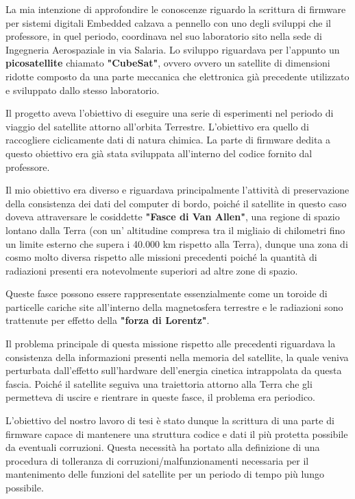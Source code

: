 \documentclass[LaM,binding=0.6cm]{../sapthesis}
\begin{document}
La mia intenzione di approfondire le conoscenze riguardo la scrittura di firmware per sistemi digitali Embedded calzava a pennello con uno degli sviluppi che il professore, in quel periodo, coordinava nel suo laboratorio sito nella sede di Ingegneria Aerospaziale in via Salaria. Lo sviluppo riguardava per l'appunto un \textbf{picosatellite} chiamato  \textbf{"CubeSat"}, ovvero ovvero un satellite di dimensioni ridotte composto da una parte meccanica che elettronica già precedente utilizzato e sviluppato dallo stesso laboratorio. 

Il progetto aveva l'obiettivo di eseguire una serie di esperimenti nel periodo di viaggio del satellite attorno all'orbita Terrestre. L'obiettivo era quello di raccogliere ciclicamente dati di natura chimica. La parte di firmware dedita a questo obiettivo era già stata sviluppata all'interno del codice fornito dal professore. 

Il mio obiettivo era diverso e riguardava principalmente l'attività di preservazione della consistenza dei dati del computer di bordo, poiché il satellite in questo caso doveva attraversare le cosiddette \textbf{"Fasce di Van Allen"}, una regione di spazio lontano dalla Terra (con un' altitudine compresa tra il migliaio di chilometri fino un limite esterno che supera i 40.000 km rispetto alla Terra), dunque una zona di cosmo molto diversa rispetto alle missioni precedenti poiché la quantità di radiazioni presenti era notevolmente superiori ad altre zone di spazio. 

Queste fasce possono essere rappresentate essenzialmente come un toroide di particelle cariche site all'interno della magnetosfera terrestre e le radiazioni sono trattenute per effetto della \textbf{"forza di Lorentz"}. 

Il problema principale di questa missione rispetto alle precedenti riguardava la consistenza della informazioni presenti nella memoria del satellite, la quale veniva perturbata dall'effetto sull'hardware dell'energia cinetica intrappolata da questa fascia. Poiché il satellite seguiva una traiettoria attorno alla Terra che gli permetteva di uscire e rientrare in queste fasce, il problema era periodico.

L'obiettivo del nostro lavoro di tesi è stato dunque la scrittura di una parte di firmware capace di mantenere una struttura codice e dati il più protetta possibile da eventuali corruzioni. Questa necessità ha portato alla definizione di una procedura di tolleranza di corruzioni/malfunzionamenti necessaria per il mantenimento delle funzioni del satellite per un periodo di tempo più lungo possibile. 
\end{document}
